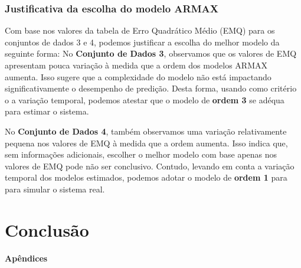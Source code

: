 \documentclass[a4paper,12pt]{article}
\begin{document}
\subsubsection{Justificativa da escolha do modelo ARMAX}

Com base nos valores da tabela de Erro Quadrático Médio (EMQ) para os conjuntos de dados 3 e 4, podemos justificar a escolha do melhor modelo da seguinte forma: No \textbf{Conjunto de Dados 3}, observamos que os valores de EMQ apresentam pouca variação à medida que a ordem dos modelos ARMAX aumenta. Isso sugere que a complexidade do modelo não está impactando significativamente o desempenho de predição. Desta forma, usando como critério o a variação temporal, podemos atestar que o modelo de \textbf{ordem 3} se adéqua para estimar o sistema.

No \textbf{Conjunto de Dados 4}, também observamos uma variação relativamente pequena nos valores de EMQ à medida que a ordem aumenta. Isso indica que, sem informações adicionais, escolher o melhor modelo com base apenas nos valores de EMQ pode não ser conclusivo. Contudo, levando em conta a variação temporal dos modelos estimados, podemos adotar o modelo de \textbf{ordem 1} para para simular o sistema real.

\newpage
\section{Conclusão}

\newpage


\nocite{*}

\newpage
\begin{flushleft}
\Large
\textbf{Apêndices}
\end{flushleft}
\end{document}
